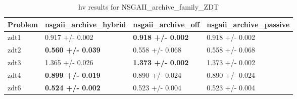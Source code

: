 \begin{table}
\caption{hv results for NSGAII_archive_family_ZDT}
\label{NSGAII_archive_family_ZDT_hv}
\begin{tabular}{llll}
\toprule
Problem & nsgaii_archive_hybrid & nsgaii_archive_off & nsgaii_archive_passive \\
\midrule
zdt1 & 0.917 +/- 0.002 & \textbf{0.918 +/- 0.002} & 0.918 +/- 0.002 \\
zdt2 & \textbf{0.560 +/- 0.039} & 0.558 +/- 0.068 & 0.558 +/- 0.068 \\
zdt3 & 1.365 +/- 0.026 & \textbf{1.373 +/- 0.002} & 1.373 +/- 0.002 \\
zdt4 & \textbf{0.899 +/- 0.019} & 0.890 +/- 0.024 & 0.890 +/- 0.024 \\
zdt6 & \textbf{0.524 +/- 0.002} & 0.523 +/- 0.004 & 0.523 +/- 0.004 \\
\bottomrule
\end{tabular}
\end{table}
